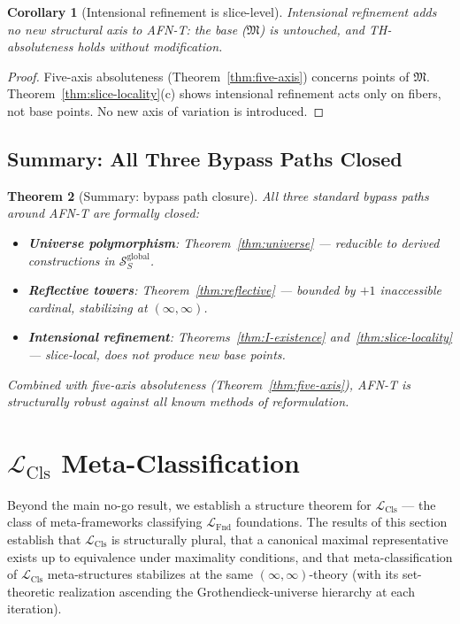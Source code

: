 \documentclass[11pt]{article}
\theoremstyle{plain}
\newtheorem{theorem}{Theorem}[section]
\newtheorem{corollary}[theorem]{Corollary}
\theoremstyle{definition}
\newcommand{\cS}{\mathcal{S}}
\newcommand{\fM}{\mathfrak{M}}
\newcommand{\LFnd}{\mathcal{L}_{\mathrm{Fnd}}}
\newcommand{\LCls}{\mathcal{L}_{\mathrm{Cls}}}
\begin{document}
\begin{corollary}[Intensional refinement is slice-level]\label{cor:slice-level}
Intensional refinement adds no new structural axis to AFN-T: the base ($\fM$) is untouched, and TH-absoluteness holds without modification.
\end{corollary}

\begin{proof}
Five-axis absoluteness (Theorem~\ref{thm:five-axis}) concerns points of $\fM$. Theorem~\ref{thm:slice-locality}(c) shows intensional refinement acts only on fibers, not base points. No new axis of variation is introduced.
\end{proof}

\subsection{Summary: All Three Bypass Paths Closed}

\begin{theorem}[Summary: bypass path closure]\label{thm:bypass-summary}
All three standard bypass paths around AFN-T are formally closed:
\begin{itemize}
\item \textbf{Universe polymorphism}: Theorem~\ref{thm:universe} — reducible to derived constructions in $\cS_S^{\mathrm{global}}$.
\item \textbf{Reflective towers}: Theorem~\ref{thm:reflective} — bounded by $+1$ inaccessible cardinal, stabilizing at $(\infty, \infty)$.
\item \textbf{Intensional refinement}: Theorems~\ref{thm:I-existence} and~\ref{thm:slice-locality} — slice-local, does not produce new base points.
\end{itemize}
Combined with five-axis absoluteness (Theorem~\ref{thm:five-axis}), AFN-T is structurally robust against all known methods of reformulation.
\end{theorem}


\section{\texorpdfstring{$\LCls$ Meta-Classification}{Classifier Meta-Classification}}\label{sec:meta}

Beyond the main no-go result, we establish a structure theorem for $\LCls$ --- the class of meta-frameworks classifying $\LFnd$ foundations. The results of this section establish that $\LCls$ is structurally plural, that a canonical maximal representative exists up to equivalence under maximality conditions, and that meta-classification of $\LCls$ meta-structures stabilizes at the same $(\infty, \infty)$-theory (with its set-theoretic realization ascending the Grothendieck-universe hierarchy at each iteration).
\end{document}

